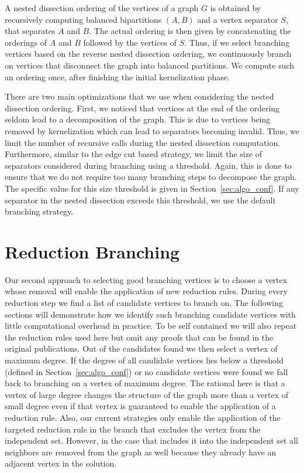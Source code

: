 \documentclass[a4paper,UKenglish,cleveref, autoref, thm-restate]{lipics-v2021}
\begin{document}
A nested dissection ordering of the vertices of a graph $G$ is obtained by recursively computing balanced bipartitions $(A,B)$ and a vertex separator $S$, that separates $A$ and $B$.
The actual ordering is then given by concatenating the orderings of $A$ and $B$ followed by the vertices of $S$.
Thus, if we select branching vertices based on the reverse nested dissection
ordering, we continuously branch on vertices that disconnect the graph into balanced partitions. 
We compute such an ordering once, after finishing the initial kernelization phase.

There are two main optimizations that we use when considering the nested dissection ordering.
First, we noticed that vertices at the end of the ordering seldom lead to a decomposition of the graph. 
This is due to vertices being removed by kernelization which can lead to separators becoming invalid.
Thus, we limit the number of recursive calls during the nested dissection computation.
Furthermore, similar to the edge cut based strategy, we limit the size of
separators considered during branching using a threshold.
Again, this is done to ensure that we do not require too many branching steps to decompose the graph.
The specific value for this size threshold is given in Section~\ref{sec:algo_conf}.
If any separator in the nested dissection exceeds this threshold, we use the default branching strategy.

\section{Reduction Branching}
\label{sec:reduction_branching}
Our second approach to selecting good branching vertices is to choose a vertex
whose removal will enable the application of new reduction rules. During every
reduction step we find a list of candidate vertices to branch on. The following
sections will demonstrate how we identify such branching candidate vertices with little
computational overhead in practice. To be self contained we will also repeat the reduction
rules used here but omit any proofs that can be found in the original
publications. Out of the candidates found we then select a vertex of
maximum degree. If the degree of all candidate vertices lies below a threshold
(defined in Section~\ref{sec:algo_conf}) or no candidate vertices were found we fall back to branching on a vertex
of maximum degree. The rational here is that a vertex of large degree changes
the structure of the graph more than a vertex of small degree even if that
vertex is guaranteed to enable the application of a reduction rule. Also, our
current strategies only enable the application of the targeted reduction rule in
the branch that excludes the vertex from the independent set. However, in the
case that includes it into the independent set all neighbors are removed from
the graph as well because they already have an adjacent vertex in the solution.
\end{document}
